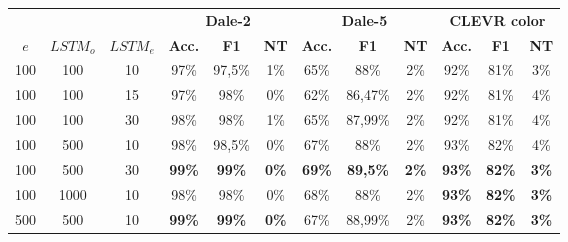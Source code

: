 \begin{table}[ht]
    \centering
    \begin{tabular}{ccc|ccc|ccc|ccc}
        \toprule
               &          &          & \multicolumn{3}{c}{\textbf{Dale-2}} & \multicolumn{3}{c}{\textbf{Dale-5}} & \multicolumn{3}{c}{\textbf{CLEVR color}}                                                                                                 \\\cmidrule(lr){4-6}\cmidrule(lr){7-9}\cmidrule(lr){10-12}
        $e$    & $LSTM_o$ & $LSTM_e$ & \textbf{Acc.}                       & \textbf{F1}                         & \textbf{NT}                              & \textbf{Acc.} & \textbf{F1}     & \textbf{NT}  & \textbf{Acc.} & \textbf{F1}   & \textbf{NT}  \\\midrule
        {100}  & {100}    & {10}     & {97\%}                              & {97,5\%}                            & {1\%}                                    & {65\%}        & {88\%}          & {2\%}        & {92\%}        & {81\%}        & {3\%}        \\
        {100}  & {100}    & {15}     & {97\%}                              & {98\%}                              & {0\%}                                    & {62\%}        & {86,47\%}       & {2\%}        & {92\%}        & {81\%}        & {4\%}        \\
        {100}  & {100}    & {30}     & {98\%}                              & {98\%}                              & {1\%}                                    & {65\%}        & {87,99\%}       & {2\%}        & {92\%}        & {81\%}        & {4\%}        \\
        {100}  & {500}    & {10}     & {98\%}                              & {98,5\%}                            & {0\%}                                    & {67\%}        & {88\%}          & {2\%}        & {93\%}        & {82\%}        & {4\%}        \\
        {100}  & {500}    & {30}     & \textbf{99\%}                       & \textbf{99\%}                       & \textbf{0\%}                             & \textbf{69\%} & \textbf{89,5\%} & \textbf{2\%} & \textbf{93\%} & \textbf{82\%} & \textbf{3\%} \\
        {100}  & {1000}   & {10}     & {98\%}                              & {98\%}                              & {0\%}                                    & {68\%}        & {88\%}          & {2\%}        & \textbf{93\%} & \textbf{82\%} & \textbf{3\%} \\
        {500}  & {500}    & {10}     & \textbf{99\%}                       & \textbf{99\%}                       & \textbf{0\%}                             & {67\%}        & {88,99\%}       & {2\%}        & \textbf{93\%} & \textbf{82\%} & \textbf{3\%} \\

\end{tabular}
\end{table}
